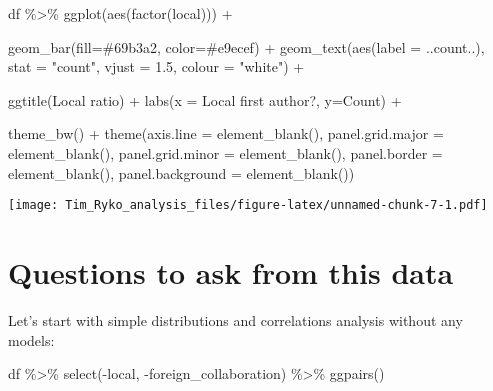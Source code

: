 \documentclass[
]{article}
\newenvironment{Shaded}{\begin{snugshade}}{\end{snugshade}}
\newcommand{\AttributeTok}[1]{\textcolor[rgb]{0.77,0.63,0.00}{#1}}
\newcommand{\FloatTok}[1]{\textcolor[rgb]{0.00,0.00,0.81}{#1}}
\newcommand{\FunctionTok}[1]{\textcolor[rgb]{0.00,0.00,0.00}{#1}}
\newcommand{\NormalTok}[1]{#1}
\newcommand{\SpecialCharTok}[1]{\textcolor[rgb]{0.00,0.00,0.00}{#1}}
\newcommand{\StringTok}[1]{\textcolor[rgb]{0.31,0.60,0.02}{#1}}
\begin{document}
\begin{Shaded}
\begin{Highlighting}[]
\NormalTok{df }\SpecialCharTok{\%\textgreater{}\%}
  \FunctionTok{ggplot}\NormalTok{(}\FunctionTok{aes}\NormalTok{(}\FunctionTok{factor}\NormalTok{(local))) }\SpecialCharTok{+}
    
    \FunctionTok{geom\_bar}\NormalTok{(}\AttributeTok{fill=}\StringTok{\textquotesingle{}\#69b3a2\textquotesingle{}}\NormalTok{, }\AttributeTok{color=}\StringTok{\textquotesingle{}\#e9ecef\textquotesingle{}}\NormalTok{) }\SpecialCharTok{+}
    \FunctionTok{geom\_text}\NormalTok{(}\FunctionTok{aes}\NormalTok{(}\AttributeTok{label =}\NormalTok{ ..count..), }\AttributeTok{stat =} \StringTok{"count"}\NormalTok{, }\AttributeTok{vjust =} \FloatTok{1.5}\NormalTok{, }\AttributeTok{colour =} \StringTok{"white"}\NormalTok{) }\SpecialCharTok{+}
    
    \FunctionTok{ggtitle}\NormalTok{(}\StringTok{\textquotesingle{}Local ratio\textquotesingle{}}\NormalTok{) }\SpecialCharTok{+}
    \FunctionTok{labs}\NormalTok{(}\AttributeTok{x =} \StringTok{\textquotesingle{}Local first author?\textquotesingle{}}\NormalTok{, }\AttributeTok{y=}\StringTok{\textquotesingle{}Count\textquotesingle{}}\NormalTok{) }\SpecialCharTok{+}
    
    \FunctionTok{theme\_bw}\NormalTok{() }\SpecialCharTok{+}
    \FunctionTok{theme}\NormalTok{(}\AttributeTok{axis.line =} \FunctionTok{element\_blank}\NormalTok{(),}
      \AttributeTok{panel.grid.major =} \FunctionTok{element\_blank}\NormalTok{(),}
      \AttributeTok{panel.grid.minor =} \FunctionTok{element\_blank}\NormalTok{(),}
      \AttributeTok{panel.border =} \FunctionTok{element\_blank}\NormalTok{(),}
      \AttributeTok{panel.background =} \FunctionTok{element\_blank}\NormalTok{())}
\end{Highlighting}
\end{Shaded}

\texttt{[image: Tim\_Ryko\_analysis\_files/figure-latex/unnamed-chunk-7-1.pdf]}

\hypertarget{questions-to-ask-from-this-data}{%
\section{Questions to ask from this
data}\label{questions-to-ask-from-this-data}}

Let's start with simple distributions and correlations analysis without
any models:

\begin{Shaded}
\begin{Highlighting}[]
\NormalTok{df }\SpecialCharTok{\%\textgreater{}\%}
  \FunctionTok{select}\NormalTok{(}\SpecialCharTok{{-}}\NormalTok{local, }\SpecialCharTok{{-}}\NormalTok{foreign\_collaboration) }\SpecialCharTok{\%\textgreater{}\%}
    \FunctionTok{ggpairs}\NormalTok{()}
\end{Highlighting}
\end{Shaded}
\end{document}
